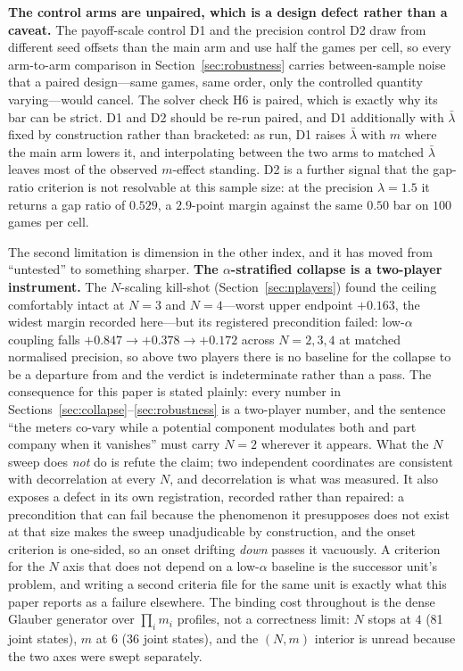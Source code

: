 \textbf{The control arms are unpaired, which is a design defect rather than a caveat.} The
payoff-scale control D1 and the precision control D2 draw from different seed offsets than
the main arm and use half the games per cell, so every arm-to-arm comparison in
Section~\ref{sec:robustness} carries between-sample noise that a paired design---same games,
same order, only the controlled quantity varying---would cancel. The solver check H6 is
paired, which is exactly why its bar can be strict. D1 and D2 should be re-run paired, and
D1 additionally with $\bar\lambda$ fixed by construction rather than bracketed: as run, D1
raises $\bar\lambda$ with $m$ where the main arm lowers it, and interpolating between the two
arms to matched $\bar\lambda$ leaves most of the observed $m$-effect standing. D2 is a
further signal that the gap-ratio criterion is not resolvable at this sample size: at the
precision $\lambda=1.5$ it returns a gap ratio of $0.529$, a $2.9$-point margin against the
same $0.50$ bar on $100$ games per cell.

The second limitation is dimension in the other index, and it has moved from ``untested''
to something sharper. \textbf{The $\alpha$-stratified collapse is a two-player instrument.}
The $N$-scaling kill-shot (Section~\ref{sec:nplayers}) found the ceiling comfortably intact
at $N=3$ and $N=4$---worst upper endpoint $+0.163$, the widest margin recorded here---but
its registered precondition failed: low-$\alpha$ coupling falls
$+0.847\to+0.378\to+0.172$ across $N=2,3,4$ at matched normalised precision, so above two
players there is no baseline for the collapse to be a departure from and the verdict is
indeterminate rather than a pass. The consequence for this paper is stated plainly: every
number in Sections~\ref{sec:collapse}--\ref{sec:robustness} is a two-player number, and the
sentence ``the meters co-vary while a potential component modulates both and part company
when it vanishes'' must carry $N=2$ wherever it appears. What the $N$ sweep does
\emph{not} do is refute the claim; two independent coordinates are consistent with
decorrelation at every $N$, and decorrelation is what was measured. It also exposes a defect
in its own registration, recorded rather than repaired: a precondition that can fail because
the phenomenon it presupposes does not exist at that size makes the sweep unadjudicable by
construction, and the onset criterion is one-sided, so an onset drifting \emph{down} passes
it vacuously. A criterion for the $N$ axis that does not depend on a low-$\alpha$ baseline
is the successor unit's problem, and writing a second criteria file for the same unit is
exactly what this paper reports as a failure elsewhere. The binding cost throughout is the
dense Glauber generator over $\prod_i m_i$ profiles, not a correctness limit: $N$ stops at
$4$ (81 joint states), $m$ at $6$ (36 joint states), and the $(N,m)$ interior is unread
because the two axes were swept separately.

